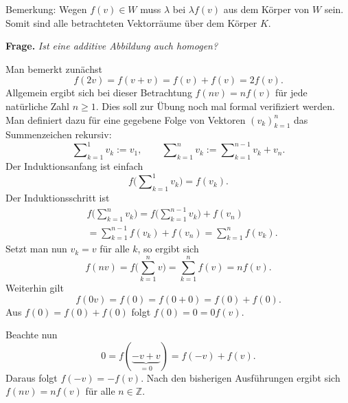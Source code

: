 \documentclass[a4paper,11pt,fleqn,twoside]{scrartcl}
\numberwithin{equation}{section}
\newcommand{\Z}{\mathbb Z}
\newcommand{\strong}[1]{{\normalfont\sffamily\bfseries #1}}
\begin{document}
Bemerkung: Wegen $f(v)\in W$ muss $\lambda$ bei $\lambda f(v)$ aus
dem Körper von $W$ sein. Somit sind alle betrachteten Vektorräume
über dem Körper $K$.

\strong{Frage.} \emph{Ist eine additive Abbildung auch homogen?}

Man bemerkt zunächst
\begin{equation}
f(2v) = f(v+v) = f(v)+f(v) = 2f(v).
\end{equation}
Allgemein ergibt sich bei dieser Betrachtung $f(nv) = nf(v)$ für jede
natürliche Zahl $n\ge 1$. Dies soll zur Übung noch mal formal
verifiziert werden. Man definiert dazu für eine gegebene Folge
von Vektoren $(v_k)_{k=1}^n$ das Summenzeichen rekursiv:
\begin{equation}
\sum\nolimits_{k=1}^1 v_k := v_1,\qquad
\sum\nolimits_{k=1}^n v_k := \sum\nolimits_{k=1}^{n-1} v_k+v_n.
\end{equation}
Der Induktionsanfang ist einfach
\begin{equation}
f\Big(\sum\nolimits_{k=1}^1 v_k\Big) = f(v_k).
\end{equation}
Der Induktionsschritt ist
\begin{equation}
\begin{split}
&f\Big(\sum\nolimits_{k=1}^n v_k\Big)
= f\Big(\sum\nolimits_{k=1}^{n-1} v_k\Big)+f(v_n)\\
&=\sum\nolimits_{k=1}^{n-1} f(v_k)+f(v_n)
= \sum\nolimits_{k=1}^n f(v_k).
\end{split}
\end{equation}
Setzt man nun $v_k=v$ für alle $k$, so ergibt sich
\begin{equation}
f(nv) = f\bigg(\sum_{k=1}^n v\bigg) = \sum_{k=1}^n f(v) = nf(v).
\end{equation}
Weiterhin gilt
\begin{equation}
f(0v) = f(0) = f(0+0) = f(0) + f(0).
\end{equation}
Aus $f(0)=f(0)+f(0)$ folgt $f(0)=0=0f(v)$.

Beachte nun
\begin{equation}
0 = f(\underbrace{-v+v}_{=0}) = f(-v)+f(v).
\end{equation}
Daraus folgt $f(-v) = -f(v)$.
Nach den bisherigen Ausführungen ergibt sich $f(nv) = nf(v)$ für alle
$n\in\Z$.
\end{document}
